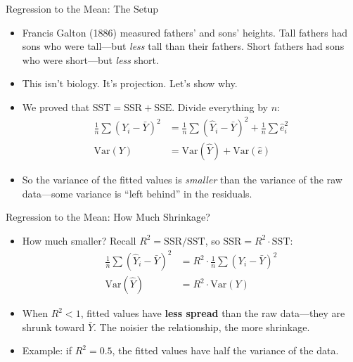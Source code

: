 \documentclass[aspectratio=169, handout]{beamer}
\numberwithin{equation}{section}
\begin{document}
\begin{frame}{Regression to the Mean: The Setup}
\begin{itemize}
\item Francis Galton (1886) measured fathers' and sons' heights. Tall fathers had sons who were tall---but \emph{less} tall than their fathers. Short fathers had sons who were short---but \emph{less} short.\pause
\item This isn't biology. It's projection. Let's show why.\pause
\item We proved that $\text{SST}=\text{SSR}+\text{SSE}$. Divide everything by $n$:
\begin{align*}
\frac{1}{n}\sum(Y_i-\bar{Y})^2 &= \frac{1}{n}\sum(\hat{Y}_i-\bar{Y})^2 + \frac{1}{n}\sum\hat{e}_i^2\\[4pt]
\text{Var}(Y) &= \text{Var}(\hat{Y}) + \text{Var}(\hat{e})
\end{align*}\pause
\item So the variance of the fitted values is \emph{smaller} than the variance of the raw data---some variance is ``left behind'' in the residuals.
\end{itemize}
\end{frame}

\begin{frame}{Regression to the Mean: How Much Shrinkage?}
\begin{itemize}
\item How much smaller? Recall $R^2 = \text{SSR}/\text{SST}$, so $\text{SSR} = R^2 \cdot \text{SST}$:
\vspace{-0.3em}
\begin{align*}
\frac{1}{n}\sum(\hat{Y}_i - \bar{Y})^2 &= R^2 \cdot \frac{1}{n}\sum(Y_i - \bar{Y})^2 \tag{divide both sides by $n$}\\[4pt]
\text{Var}(\hat{Y}) &= R^2 \cdot \text{Var}(Y)
\end{align*}
\vspace{-0.5em}\pause
\item When $R^2<1$, fitted values have \textbf{less spread} than the raw data---they are shrunk toward $\bar{Y}$. The noisier the relationship, the more shrinkage.\pause
\item Example: if $R^2=0.5$, the fitted values have half the variance of the data.
\end{itemize}
\end{frame}
\end{document}
